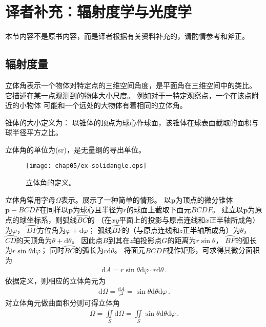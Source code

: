 \section{译者补充：辐射度学与光度学}\label{sec:译者补充：辐射度学与光度学}

\begin{remark}
      本节内容不是原书内容，而是译者根据有关资料\citep{978-7-5640-0658-7,
            wiki:solidangle,GB3102.6-93,enwiki:1052681830,
            wiki:candela,Hoffmann2015}补充的，请酌情参考和斧正。
\end{remark}

\subsection{辐射度量}\label{sub:辐射度量}
立体角表示一个物体对特定点的三维空间角度，是平面角在三维空间中的类比。
它描述在某一点观测到的物体大小尺度。
例如对于一特定观察点，一个在该点附近的小物体
可能和一个远处的大物体有着相同的立体角。
\begin{definition}
      锥体的大小定义为：
      以锥体的顶点为球心作球面，该锥体在球表面截取的面积与球半径平方之比。
\end{definition}
立体角的单位为(sr)，是无量纲的导出单位。

\begin{figure}[htbp]
      \centering\texttt{[image: chap05/ex-solidangle.eps]}
      \caption{立体角的定义。}
      \label{fig:5.ex01}
\end{figure}

立体角常用字母$\varOmega$表示。展示了一种简单的情形。
以$\bm p$为顶点的微分锥体${\bm p}-BCDF$在同样以$\bm p$为球心且半径为$r$的球面上截取下面元$BCDF$。
建立以$\bm p$为原点的球坐标系，则弧线$\wideparen{BC}$的
（在$xy$平面上的投影与原点连线和$x$正半轴所成角）为$\varphi$，
$\wideparen{DF}$方位角为$\varphi+\mathrm{d}\varphi$；
弧线$\wideparen{BF}$的（与原点连线和$z$正半轴所成角）为$\theta$，
$\wideparen{CD}$的天顶角为$\theta+\mathrm{d}\theta$。
因此点$B$到其在$z$轴投影点$G$的距离为$r\sin\theta$，
$\wideparen{BF}$的弧长为$r\sin\theta\mathrm{d}\varphi$；
同时$\wideparen{BC}$的弧长为$r\mathrm{d}\theta$。
将面元$BCDF$视作矩形，可求得其微分面积为
\begin{align}
      \mathrm{d}A=r\sin\theta\mathrm{d}\varphi\cdot r\mathrm{d}\theta\, .
\end{align}
依据定义，则相应的立体角元为
\begin{align}
      \mathrm{d}\varOmega=\frac{\mathrm{d}A}{r^2}=\sin\theta\mathrm{d}\theta\mathrm{d}\varphi\, .
\end{align}
对立体角元做曲面积分则可得立体角
\begin{align}
      \varOmega=\iint\limits_S \mathrm{d}\varOmega=\iint\limits_S \sin\theta\mathrm{d}\theta\mathrm{d}\varphi\, .
\end{align}


